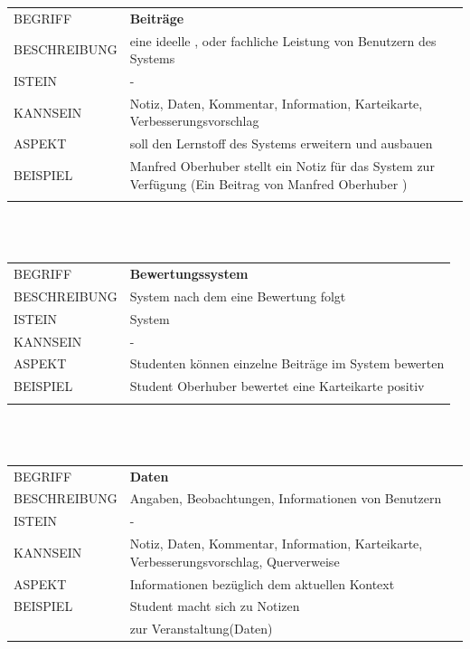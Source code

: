 \documentclass[12pt,a4paper]{article}
\begin{document}
\begin{tabular}{l p{12cm}}
BEGRIFF 	 & \textbf{Beiträge} \\ 
BESCHREIBUNG & eine ideelle , oder fachliche Leistung von Benutzern des Systems \\ 
ISTEIN   	 &  -\\
KANNSEIN 	 & Notiz, Daten, Kommentar, Information, Karteikarte, Verbesserungsvorschlag\\ 
ASPEKT   	 & soll den Lernstoff des Systems erweitern und ausbauen\\
BEISPIEL 	 & Manfred Oberhuber stellt ein Notiz für das System zur Verfügung
			 (Ein Beitrag von Manfred Oberhuber )\\\\
\hline
\end{tabular}\\\\  

\begin{tabular}{l p{12cm}}
BEGRIFF 	 & \textbf{Bewertungssystem} \\ 
BESCHREIBUNG & System nach dem eine Bewertung folgt\\ 
ISTEIN   	 & System\\
KANNSEIN 	 & - \\ 
ASPEKT   	 & Studenten können einzelne Beiträge im System bewerten\\
BEISPIEL 	 & Student Oberhuber bewertet eine Karteikarte positiv \\\\
\hline
\end{tabular}\\\\  

\begin{tabular}{l p{12cm}}
BEGRIFF 	 & \textbf{Daten} \\ 
BESCHREIBUNG & Angaben, Beobachtungen, Informationen von Benutzern\\ 
ISTEIN   	 & -\\
KANNSEIN 	 & Notiz, Daten, Kommentar, Information, Karteikarte, Verbesserungsvorschlag, 					   Querverweise\\ 
ASPEKT   	 & Informationen bezüglich dem aktuellen Kontext\\
BEISPIEL 	 & Student macht sich zu Notizen\\
			 & zur Veranstaltung(Daten) \\
\hline
\end{tabular}\\ 
\end{document}
